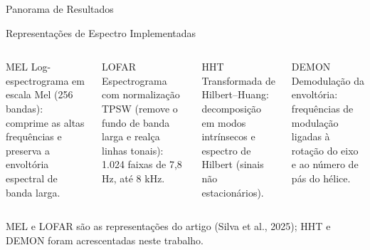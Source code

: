 \documentclass[aspectratio=169]{beamer}
\begin{document}
\begin{frame}
    \centering
    \huge Panorama de Resultados
\end{frame}

\begin{frame}{Representações de Espectro Implementadas}
    \footnotesize
    \begin{columns}[t]
        \begin{block}{\small MEL}
            \scriptsize
            Log-espectrograma em escala Mel (256 bandas): comprime as altas frequências e preserva a envoltória espectral de banda larga.
        \end{block}
        \begin{block}{\small LOFAR}
            \scriptsize
            Espectrograma com normalização TPSW (remove o fundo de banda larga e realça linhas tonais): 1.024 faixas de 7,8 Hz, até 8 kHz.
        \end{block}

        \begin{block}{\small HHT}
            \scriptsize
            Transformada de Hilbert--Huang: decomposição em modos intrínsecos e espectro de Hilbert (sinais não estacionários).
        \end{block}
        \begin{block}{\small DEMON}
            \scriptsize
            Demodulação da envoltória: frequências de modulação ligadas à rotação do eixo e ao número de pás do hélice.
        \end{block}
    \end{columns}
    \vspace{0.1cm}
    {\scriptsize MEL e LOFAR são as representações do artigo (Silva et al., 2025); HHT e DEMON foram acrescentadas neste trabalho.\par}
\end{frame}
\end{document}
